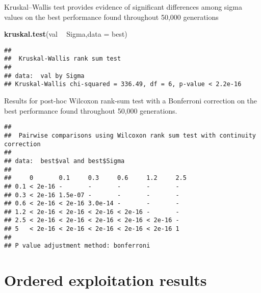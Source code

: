 \documentclass[]{book}
\newenvironment{Shaded}{\begin{snugshade}}{\end{snugshade}}
\newcommand{\DataTypeTok}[1]{\textcolor[rgb]{0.13,0.29,0.53}{#1}}
\newcommand{\KeywordTok}[1]{\textcolor[rgb]{0.13,0.29,0.53}{\textbf{#1}}}
\newcommand{\NormalTok}[1]{#1}
\newcommand{\OperatorTok}[1]{\textcolor[rgb]{0.81,0.36,0.00}{\textbf{#1}}}
\newcommand{\OtherTok}[1]{\textcolor[rgb]{0.56,0.35,0.01}{#1}}
\newcommand{\StringTok}[1]{\textcolor[rgb]{0.31,0.60,0.02}{#1}}
\begin{document}
Kruskal--Wallis test provides evidence of significant differences among sigma values on the best performance found throughout 50,000 generations

\begin{Shaded}
\begin{Highlighting}[]
\KeywordTok{kruskal.test}\NormalTok{(val }\OperatorTok{~}\StringTok{ }\NormalTok{Sigma,}\DataTypeTok{data =}\NormalTok{ best)}
\end{Highlighting}
\end{Shaded}

\begin{verbatim}
## 
##  Kruskal-Wallis rank sum test
## 
## data:  val by Sigma
## Kruskal-Wallis chi-squared = 336.49, df = 6, p-value < 2.2e-16
\end{verbatim}

Results for post-hoc Wilcoxon rank-sum test with a Bonferroni correction on the best performance found throughout 50,000 generations.

\begin{Shaded}
\end{Shaded}

\begin{verbatim}
## 
##  Pairwise comparisons using Wilcoxon rank sum test with continuity correction 
## 
## data:  best$val and best$Sigma 
## 
##     0       0.1     0.3     0.6     1.2     2.5
## 0.1 < 2e-16 -       -       -       -       -  
## 0.3 < 2e-16 1.5e-07 -       -       -       -  
## 0.6 < 2e-16 < 2e-16 3.0e-14 -       -       -  
## 1.2 < 2e-16 < 2e-16 < 2e-16 < 2e-16 -       -  
## 2.5 < 2e-16 < 2e-16 < 2e-16 < 2e-16 < 2e-16 -  
## 5   < 2e-16 < 2e-16 < 2e-16 < 2e-16 < 2e-16 1  
## 
## P value adjustment method: bonferroni
\end{verbatim}

\hypertarget{ordered-exploitation-results-3}{%
\section{Ordered exploitation results}\label{ordered-exploitation-results-3}}
\end{document}
